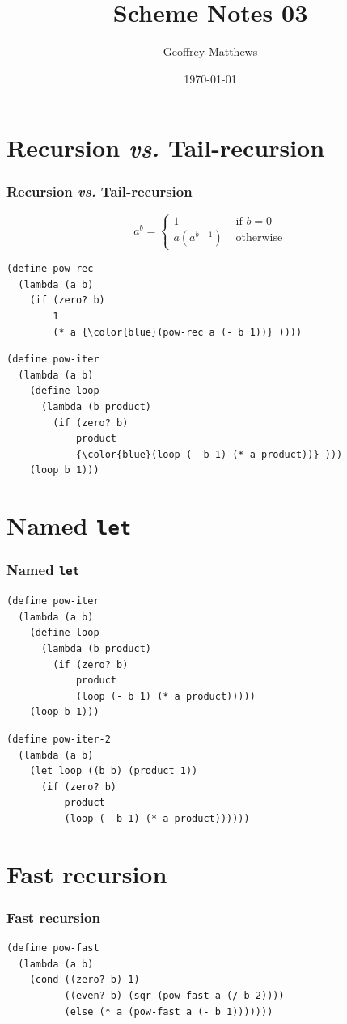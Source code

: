 \documentclass{beamer}
\title
{
Scheme Notes 03
}
\subtitle{
} %
\author[Geoffrey Matthews]
{Geoffrey Matthews}
\institute[WWU/CS]
{
  Department of Computer Science\\
  Western Washington University
}
\date{\today}
\newcommand{\sect}[1]{
\section{#1}
\begin{frame}[fragile]\frametitle{#1}
}
\begin{document}
\begin{frame}
  \titlepage
\end{frame}


\newcommand{\myref}[1]{\small\item\url{#1}}
\newcommand{\myreft}[1]{\footnotesize\item\url{#1}}


\sect{Recursion {\em vs.} Tail-recursion}

\[ a^b = \left\{\begin{array}{ll} 1 & \mbox{ if $b=0$}\\
    a(a^{b-1}) & \mbox{ otherwise}
  \end{array}\right.
  \]

\begin{Verbatim}[commandchars=\\\{\}]
(define pow-rec
  (lambda (a b)
    (if (zero? b) 
        1
        (* a {\color{blue}(pow-rec a (- b 1))} ))))
\end{Verbatim}
\vfill\pause

\begin{Verbatim}[commandchars=\\\{\}]
(define pow-iter
  (lambda (a b)
    (define loop
      (lambda (b product)
        (if (zero? b)
            product
            {\color{blue}(loop (- b 1) (* a product))} )))
    (loop b 1)))
\end{Verbatim}
\end{frame}

\sect{Named {\tt let}}

\begin{Verbatim}
(define pow-iter
  (lambda (a b)
    (define loop
      (lambda (b product)
        (if (zero? b)
            product
            (loop (- b 1) (* a product)))))
    (loop b 1)))
\end{Verbatim}
\vfill
\begin{Verbatim}
(define pow-iter-2
  (lambda (a b)
    (let loop ((b b) (product 1))
      (if (zero? b)
          product
          (loop (- b 1) (* a product))))))
\end{Verbatim}
\end{frame}

\sect{Fast recursion}
\begin{Verbatim}
(define pow-fast
  (lambda (a b)
    (cond ((zero? b) 1)
          ((even? b) (sqr (pow-fast a (/ b 2))))
          (else (* a (pow-fast a (- b 1)))))))
\end{Verbatim}
\end{frame}
\end{document}
